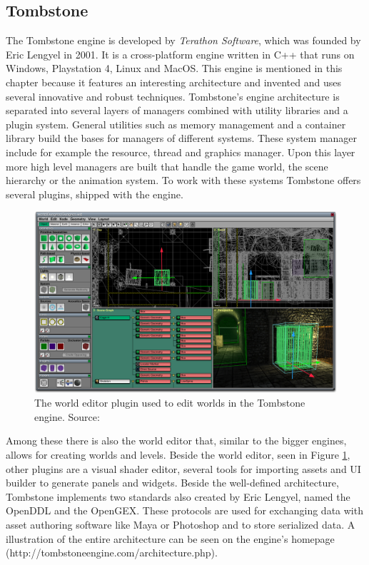 \subsection{Tombstone}

The Tombstone engine is developed by \textit{Terathon Software}, which was founded by Eric Lengyel in 2001. It is a cross-platform engine written in C++ that runs on Windows, Playstation 4, Linux and MacOS. This engine is mentioned in this chapter because it features an interesting architecture and invented and uses several innovative and robust techniques.
Tombstone's engine architecture is separated into several layers of managers combined with utility libraries and a plugin system. General utilities such as memory management and a container library build the bases for managers of different systems. These system manager include for example the resource, thread and graphics manager. Upon this layer more high level managers are built that handle the game world, the scene hierarchy or the animation system. To work with these systems Tombstone offers several plugins, shipped with the engine.

 \begin{figure}[h!]
 	\centering \includegraphics[width=0.5 \linewidth]{PICs/tombstone_ed.png}
 	\caption{The world editor plugin used to edit worlds in the Tombstone engine. Source: \cite{Tombstone}}
 	\label{fig:tombstone_ed}
 \end{figure}

Among these there is also the world editor that, similar to the bigger engines, allows for creating worlds and levels. Beside the world editor, seen in Figure \ref{fig:tombstone_ed}, other plugins are a visual shader editor, several tools for importing assets and \ac{UI} builder to generate panels and widgets. Beside the well-defined architecture, Tombstone implements two standards also created by Eric Lengyel, named the \ac{OpenDDL} and the \ac{OpenGEX}. These protocols are used for exchanging data with asset authoring software like Maya or Photoshop and to store serialized data. A illustration of the entire architecture can be seen on the engine's homepage (http://tombstoneengine.com/architecture.php).

